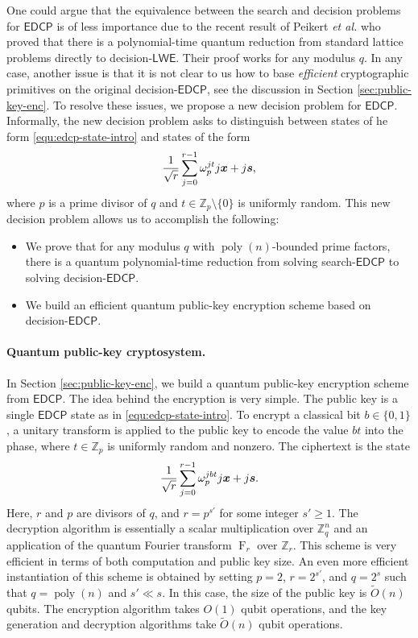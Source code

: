 \documentclass[11pt]{article}
\theoremstyle{plain}
\theoremstyle{definition}
\newcommand{\tildO}{\tilde{O}}
\DeclareMathOperator{\poly}{poly}
\DeclareMathOperator{\qft}{F}
\let\ket\relax
\DeclarePairedDelimiter{\ket}{\lvert}{\rangle}
\def\Z{\mathbb{Z}}
\def\lwe{\mathsf{LWE}}
\def\edcp{\mathsf{EDCP}}
\begin{document}
One could argue that the equivalence between the search and decision problems for $\edcp$ is of less importance due to the recent result of Peikert \textit{et al.} \cite{peikert2017pseudorandomness} who proved that there is a polynomial-time quantum reduction from standard lattice problems directly to decision-$\lwe$. Their proof works for any modulus $q$. In any case, another issue is that it is not clear to us how to base \textit{efficient} cryptographic primitives on the original decision-$\edcp$, see the discussion in Section \ref{sec:public-key-enc}. To resolve these issues, we propose a new decision problem for $\edcp$. Informally, the new decision problem asks to distinguish between states of he form \eqref{equ:edcp-state-intro} and states of the form 
\[ \frac{1}{\sqrt{r}} \sum_{j = 0}^{r - 1} \omega_p^{jt} \ket{j}\ket{\bm{x} + j\bm{s}}, \]
where $p$ is a prime divisor of $q$ and $t \in \Z_p {\setminus} \{0\}$ is uniformly random. This new decision problem allows us to accomplish the following:
\begin{itemize}
\item We prove that for any modulus $q$ with $\poly(n)$-bounded prime factors, there is a quantum polynomial-time reduction from solving search-$\edcp$ to solving decision-$\edcp$.
\item We build an efficient quantum public-key encryption scheme based on decision-$\edcp$.
\end{itemize}
 
\paragraph{Quantum public-key cryptosystem.}
In Section \ref{sec:public-key-enc}, we build a quantum public-key encryption scheme from $\edcp$. The idea behind the encryption is very simple. The public key is a single $\edcp$ state as in \eqref{equ:edcp-state-intro}. To encrypt a classical bit $b \in \{0,1\}$, a unitary transform is applied to the public key to encode the value $bt$ into the phase, where $t \in \Z_p$ is uniformly random and nonzero. The ciphertext is the state
\[ \frac{1}{\sqrt{r}} \sum_{j = 0}^{r - 1} \omega_p^{jbt} \ket{j}\ket{\bm{x} + j\bm{s}}. \]
Here, $r$ and $p$ are divisors of $q$, and $r = p^{s'}$ for some integer $s' \ge 1$. The decryption algorithm is essentially a scalar multiplication over $\Z_q^n$ and an application of the quantum Fourier transform $\qft_r$ over $\Z_r$. This scheme is very efficient in terms of both computation and public key size. An even more efficient instantiation of this scheme is obtained by setting $p = 2$, $r = 2^{s'}$, and $q = 2^s$ such that $q = \poly(n)$ and $s' \ll s$. In this case, the size of the public key is $\tildO(n)$ qubits. The encryption algorithm takes $O(1)$ qubit operations, and the key generation and decryption algorithms take $\tildO(n)$ qubit operations.
\end{document}
